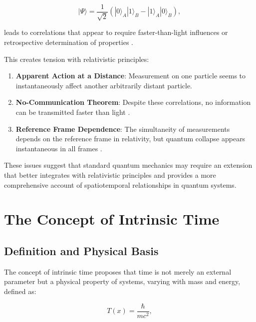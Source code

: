 \documentclass[12pt,a4paper]{article}
\newcommand{\Tfield}{T(x)}
\begin{document}
	\begin{equation}
		|\Psi\rangle = \frac{1}{\sqrt{2}}(|0\rangle_A |1\rangle_B - |1\rangle_A |0\rangle_B),
		\label{eq:entangled_state}
	\end{equation}
	
	leads to correlations that appear to require faster-than-light influences or retrospective determination of properties \cite{EPR1935}.
	
	This creates tension with relativistic principles:
	
	\begin{enumerate}
		\item \textbf{Apparent Action at a Distance}: Measurement on one particle seems to instantaneously affect another arbitrarily distant particle.
		
		\item \textbf{No-Communication Theorem}: Despite these correlations, no information can be transmitted faster than light \cite{Eberhard1978, Ghirardi1980}.
		
		\item \textbf{Reference Frame Dependence}: The simultaneity of measurements depends on the reference frame in relativity, but quantum collapse appears instantaneous in all frames \cite{Aharonov1980, Aharonov1981}.
	\end{enumerate}
	
	These issues suggest that standard quantum mechanics may require an extension that better integrates with relativistic principles and provides a more comprehensive account of spatiotemporal relationships in quantum systems.
	
	\section{The Concept of Intrinsic Time}
	\label{sec:intrinsic_time}
	
	\subsection{Definition and Physical Basis}
	\label{subsec:intrinsic_definition}
	
	The concept of intrinsic time proposes that time is not merely an external parameter but a physical property of systems, varying with mass and energy, defined as:
	
	\begin{equation}
		\Tfield = \frac{\hbar}{mc^2},
		\label{eq:intrinsic_time}
	\end{equation}
	
\end{document}
